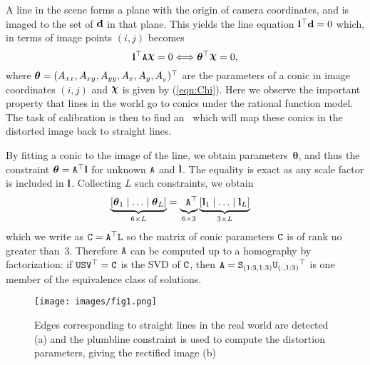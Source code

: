 \documentclass[extendedabs]{bmvc2k}
\begin{document}
\def\conic{{\boldsymbol\theta}}
A line in the scene forms a plane with the origin of camera
coordinates, and is imaged to the set of ${\bf d}$ in that plane.
This yields the line equation ${\bf l}^{\top} {\bf d} = 0$ which, in
terms of image points $(i,j)$ becomes
\begin{equation}
\vect l\tr \A \Chi = 0 \Longleftrightarrow \conic^{\top} \Chi = 0,
\end{equation}
where $\conic = (A_{xx}, A_{xy}, A_{yy}, A_x, A_y,
A_{_\mathit{0}})\tr$ are the parameters of a conic in image coordinates $(i,j)$
and $\Chi$ is given by (\ref{eqn:Chi}).  Here we observe the
important property that lines in the world go to conics under the
rational function model.  The task of calibration is then to find an
\A\ which will map these conics in the distorted image back to
straight lines.

By fitting a conic to the image of the line, we obtain
parameters~$\conic$, and thus the constraint
$\conic = \A\tr \vect l$
for unknown $\mbox{${\tt A}$}$ and ${\bf l}$.  The equality is exact as any scale
factor is included in ${\bf l}$. Collecting $L$ such constraints, we
obtain
\begin{align}
\underbrace{\left[ \conic_1 \mid \ldots \mid \conic_L
\right]}_{6\times L} & =
\underbrace{\phantom{\left[\right]}\A\tr}_{6\times 3}
\underbrace{\left[ \vect l_1 \mid \ldots \mid \vect l_L \right]}_{3\times L}
\nonumber
\end{align}
which we write as
$\mbox{\tt C} = \mbox{${\tt A}$}^{\top} \mbox{\tt L}\label{eqn:proj_line}$
so the matrix of conic parameters $\mbox{\tt C}$ is of rank no greater
than~$3$.  Therefore $\mbox{${\tt A}$}$ can be computed up to a homography by
factorization: if $\mbox{\tt U} \mbox{\tt S} \mbox{\tt V}^{\top} = \mbox{\tt C}$ is the SVD
of $\mbox{\tt C}$, then $\mbox{${\tt A}$} = \mbox{\tt S}_{(1:3,1:3)} {\mbox{\tt U}_{(:,1:3)}}^{\top}$
is one member of the equivalence class of solutions.

\begin{figure}[t]
\texttt{[image: images/fig1.png]}
\caption{
Edges corresponding to straight lines in the real world are
detected (a) and the plumbline constraint is used to compute the
distortion parameters, giving the rectified image (b)}
\vspace{-2mm}
\end{figure}
\end{document}
